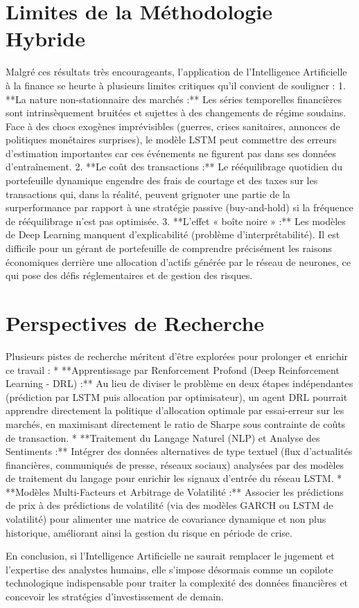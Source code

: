\section*{Limites de la Méthodologie Hybride}
Malgré ces résultats très encourageants, l'application de l'Intelligence Artificielle à la finance se heurte à plusieurs limites critiques qu'il convient de souligner :
1. **La nature non-stationnaire des marchés :** Les séries temporelles financières sont intrinsèquement bruitées et sujettes à des changements de régime soudains. Face à des chocs exogènes imprévisibles (guerres, crises sanitaires, annonces de politiques monétaires surprises), le modèle LSTM peut commettre des erreurs d'estimation importantes car ces événements ne figurent pas dans ses données d'entraînement.
2. **Le coût des transactions :** Le rééquilibrage quotidien du portefeuille dynamique engendre des frais de courtage et des taxes sur les transactions qui, dans la réalité, peuvent grignoter une partie de la surperformance par rapport à une stratégie passive (buy-and-hold) si la fréquence de rééquilibrage n'est pas optimisée.
3. **L'effet « boîte noire » :** Les modèles de Deep Learning manquent d'explicabilité (problème d'interprétabilité). Il est difficile pour un gérant de portefeuille de comprendre précisément les raisons économiques derrière une allocation d'actifs générée par le réseau de neurones, ce qui pose des défis réglementaires et de gestion des risques.

\section*{Perspectives de Recherche}
Plusieurs pistes de recherche méritent d'être explorées pour prolonger et enrichir ce travail :
* **Apprentissage par Renforcement Profond (Deep Reinforcement Learning - DRL) :** Au lieu de diviser le problème en deux étapes indépendantes (prédiction par LSTM puis allocation par optimisateur), un agent DRL pourrait apprendre directement la politique d'allocation optimale par essai-erreur sur les marchés, en maximisant directement le ratio de Sharpe sous contrainte de coûts de transaction.
* **Traitement du Langage Naturel (NLP) et Analyse des Sentiments :** Intégrer des données alternatives de type textuel (flux d'actualités financières, communiqués de presse, réseaux sociaux) analysées par des modèles de traitement du langage pour enrichir les signaux d'entrée du réseau LSTM.
* **Modèles Multi-Facteurs et Arbitrage de Volatilité :** Associer les prédictions de prix à des prédictions de volatilité (via des modèles GARCH ou LSTM de volatilité) pour alimenter une matrice de covariance dynamique et non plus historique, améliorant ainsi la gestion du risque en période de crise.

En conclusion, si l'Intelligence Artificielle ne saurait remplacer le jugement et l'expertise des analystes humains, elle s'impose désormais comme un copilote technologique indispensable pour traiter la complexité des données financières et concevoir les stratégies d'investissement de demain.
